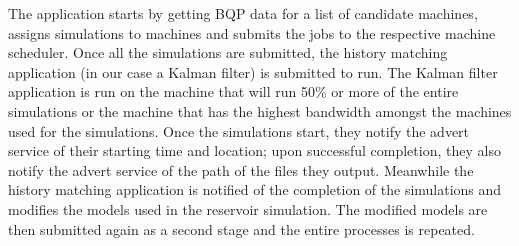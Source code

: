 \documentclass[conference,final]{IEEEtran}
\begin{document}
The application starts by getting BQP data for a list of candidate
machines, assigns simulations to machines and submits the jobs to the
respective machine scheduler. Once all the simulations are submitted,
the history matching application (in our case a Kalman filter) is
submitted to run. The Kalman filter application is run on the
machine that will run 50\% or more of the entire simulations or the
machine that has the highest bandwidth amongst the machines used for
the simulations.  Once the simulations start, they notify the advert
service of their starting time and location; upon successful
completion, they also notify the advert service of the path of the
files they output.  Meanwhile the history matching application is
notified of the completion of the simulations and modifies the models
used in the reservoir simulation. The modified models are then
submitted again as a second stage and the entire processes is
repeated.



\end{document}
